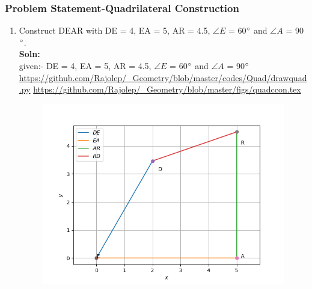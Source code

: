 \begin{frame}
\frametitle{Problem Statement-Quadrilateral Construction}
\begin{enumerate}[label=(\roman*)]
\item Construct DEAR with DE = 4, EA = 5, AR = 4.5, $\angle {E}$ = 60$\degree$ and $\angle {A}$ = 90$\degree$.\\
\textbf{Soln:}\\
given:-  DE = 4, EA = 5, AR = 4.5, $\angle {E}$ = 60$\degree$ and $\angle {A}$ = 90$\degree$\\
\url{https://github.com/Rajolep/_Geometry/blob/master/codes/Quad/drawquad.py}
\url{https://github.com/Rajolep/_Geometry/blob/master/figs/quadccon.tex}
\begin{figure}

\includegraphics[scale=0.2]{./figs/quadcon.png}
\end{figure}
  \end{enumerate}

\end{frame}
